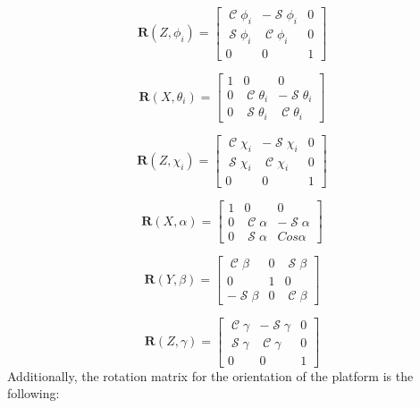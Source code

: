 \documentclass[titlepage, letterpaper]{article}
\DeclareMathOperator{\cose}{\mathcal{C}}
\DeclareMathOperator{\sen}{\mathcal{S}}
\begin{document}
\begin{equation}
    \label{eq:rot_Zphi}
    \mathbf{R}(Z,\phi_i) =
    \begin{bmatrix}
        \cose\phi_i & -\sen\phi_i & 0 \\
        \sen\phi_i & \cose\phi_i & 0 \\
        0 & 0 & 1
    \end{bmatrix}
\end{equation}

\begin{equation}
    \label{eq:rot_Xtheta}
    \mathbf{R}(X,\theta_i) =
    \begin{bmatrix}
        1 & 0 & 0 \\
        0 & \cose\theta_{i} & -\sen\theta_{i} \\
        0 & \sen\theta_{i} & \cose\theta_{i}
    \end{bmatrix}
\end{equation}

\begin{equation}
    \label{eq:rot_Zchi}
    \mathbf{R}(Z,\chi_i) =
    \begin{bmatrix}
    \cose\chi_i & -\sen\chi_i & 0 \\
    \sen\chi_i & \cose\chi_i & 0 \\
    0 & 0 & 1
    \end{bmatrix}
\end{equation}

\begin{equation}
    \label{eq:rot_Xalpha}
    \mathbf{R}(X,\alpha) = 
    \begin{bmatrix}
    1 & 0 & 0 \\
    0 & \cose\alpha & -\sen \alpha \\
    0 & \sen\alpha & Cos \alpha
    \end{bmatrix}
\end{equation}

\begin{equation}
    \label{eq:rot_Ybeta}
    \mathbf{R}(Y,\beta) =
    \begin{bmatrix}
        \cose\beta & 0 & \sen\beta \\
        0 & 1 & 0 \\
        -\sen\beta & 0 &\cose\beta
    \end{bmatrix}
\end{equation}

\begin{equation}
    \label{eq:rot_Xgamma}
    \mathbf{R}(Z,\gamma) =
    \begin{bmatrix}
        \cose\gamma & -\sen\gamma & 0 \\
        \sen\gamma & \cose\gamma & 0 \\
        0 & 0 & 1
    \end{bmatrix}
\end{equation}
Additionally, the rotation matrix for the orientation of the platform is the following:
\end{document}
